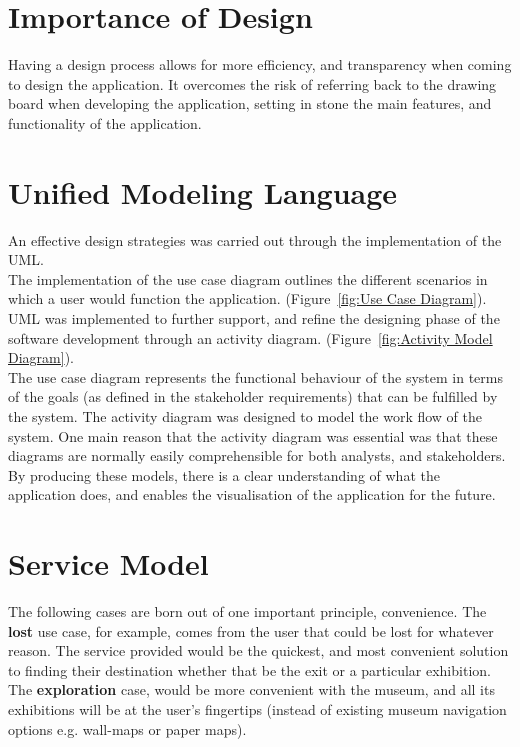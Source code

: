 
\section{Importance of Design}
Having a design process allows for more efficiency, and transparency when coming to design the application. It overcomes the risk of referring back to the drawing board when developing the application, setting in stone the main features, and functionality of the application.

\section{Unified Modeling Language}
An effective design strategies was carried out through the implementation of the UML.\\

The implementation of the use case diagram outlines the different scenarios in which a user would function the application. (Figure~\ref{fig:Use Case Diagram}). UML was implemented to further support, and refine the designing phase of the software development through an activity diagram. (Figure~\ref{fig:Activity Model Diagram}).\\

The use case diagram represents the functional behaviour of the system in terms of the goals (as defined in the stakeholder requirements) that can be fulfilled by the system. The activity diagram was designed to model the work flow of the system. One main reason that the activity diagram was essential was that these diagrams are normally easily comprehensible for both analysts, and stakeholders. By producing these models, there is a clear understanding of what the application does, and enables the visualisation of the application for the future.

\section{Service Model}
The following cases are born out of one important principle, convenience. The \textbf{lost} use case, for example, comes from the user that could be lost for whatever reason. The service provided would be the quickest, and most convenient solution to finding their destination whether that be the exit or a particular exhibition. The \textbf{exploration} case, would be more convenient with the museum, and all its exhibitions will be at the user's fingertips (instead of existing museum navigation options e.g. wall-maps or paper maps).

